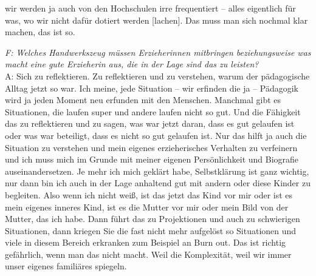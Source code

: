 \begin{linenumbers*}
wir werden ja auch von den Hochschulen irre frequentiert -- alles eigentlich für was, wo wir nicht dafür dotiert werden [lachen]. Das muss man sich nochmal klar machen, das ist so.

\emph{F: Welches Handwerkszeug müssen Erzieherinnen mitbringen beziehungsweise was macht eine gute Erzieherin aus, die in der Lage sind das zu leisten?}\\
A: Sich zu reflektieren. Zu reflektieren und zu verstehen, warum der pädagogische Alltag jetzt so war. Ich meine, jede Situation -- wir erfinden die ja -- Pädagogik wird ja jeden Moment neu erfunden mit den Menschen. Manchmal gibt es Situationen, die laufen super und andere laufen nicht so gut. Und die Fähigkeit das zu reflektieren und zu sagen, was war jetzt daran, dass es gut gelaufen ist oder was war beteiligt, dass es nicht so gut gelaufen ist. Nur das hilft ja auch die Situation zu verstehen und mein eigenes erzieherisches Verhalten zu verfeinern und ich muss mich im Grunde mit meiner eigenen Persönlichkeit und Biografie auseinandersetzen. Je mehr ich mich geklärt habe, Selbstklärung ist ganz wichtig, nur dann bin ich auch in der Lage anhaltend gut mit andern oder diese Kinder zu begleiten. Also wenn ich nicht weiß, ist das jetzt das Kind vor mir oder ist es mein eigenes inneres Kind, ist es die Mutter vor mir oder mein Bild von der Mutter, das ich habe. Dann führt das zu Projektionen und auch zu schwierigen Situationen, dann kriegen Sie die fast nicht mehr aufgelöst so Situationen und viele in diesem Bereich erkranken zum Beispiel an Burn out. Das ist richtig gefährlich, wenn man das nicht macht. Weil die Komplexität, weil wir immer unser eigenes familiäres spiegeln. 


\end{linenumbers*}
